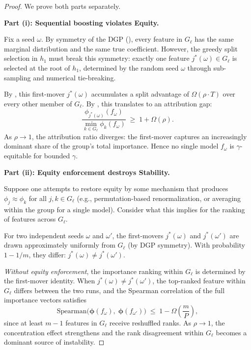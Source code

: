 \documentclass[11pt]{article}
\theoremstyle{remark}
\newcommand{\Gl}{G_\ell}                    %
\newcommand{\phij}{\phi_j}                  %
\newcommand{\phik}{\phi_k}                  %
\newcommand{\totalT}{T}                     %
\newcommand{\rhovar}{\rho}                  %
\begin{document}
\begin{proof}
We prove both parts separately.

\medskip
\noindent\textbf{Part (i): Sequential boosting violates Equity.}

Fix a seed $\omega$.  By symmetry of the DGP
(), every feature in $\Gl$ has the same marginal
distribution and the same true coefficient.  However, the greedy split
selection in $h_1$ must break this symmetry: exactly one feature
$j^*(\omega) \in \Gl$ is selected at the root of $h_1$, determined by
the random seed $\omega$ through sub-sampling and numerical tie-breaking.

By , this first-mover $j^*(\omega)$
accumulates a split advantage of $\Omega(\rhovar \cdot \totalT)$ over
every other member of $\Gl$.  By , this
translates to an attribution gap:
\begin{equation}
  \frac{\phi_{j^*(\omega)}(f_\omega)}
       {\min_{k \in \Gl} \phik(f_\omega)}
  \;\geq\; 1 + \Omega(\rhovar).
\end{equation}
As $\rhovar \to 1$, the attribution ratio diverges: the first-mover
captures an increasingly dominant share of the group's total importance.
Hence no single model $f_\omega$ is $\gamma$-equitable for bounded
$\gamma$.

\medskip
\noindent\textbf{Part (ii): Equity enforcement destroys Stability.}

Suppose one attempts to restore equity by some mechanism that produces
$\phij \approx \phik$ for all $j, k \in \Gl$ (e.g., permutation-based
renormalization, or averaging within the group for a single model).
Consider what this implies for the ranking of features across $\Gl$.

For two independent seeds $\omega$ and $\omega'$, the first-movers
$j^*(\omega)$ and $j^*(\omega')$ are drawn approximately uniformly from
$\Gl$ (by DGP symmetry).  With probability $1 - 1/m$, they differ:
$j^*(\omega) \neq j^*(\omega')$.

\emph{Without equity enforcement}, the importance ranking within $\Gl$ is
determined by the first-mover identity.  When
$j^*(\omega) \neq j^*(\omega')$, the top-ranked feature within $\Gl$
differs between the two runs, and the Spearman correlation of the
full importance vectors satisfies
\begin{equation}
  \mathrm{Spearman}\bigl(\boldsymbol{\phi}(f_\omega),\;
    \boldsymbol{\phi}(f_{\omega'})\bigr)
  \;\leq\; 1 - \Omega\!\left(\frac{m}{P}\right),
\end{equation}
since at least $m - 1$ features in $\Gl$ receive reshuffled ranks.
As $\rhovar \to 1$, the concentration effect strengthens and the
rank disagreement within $\Gl$ becomes a dominant source of instability.


\end{proof}
\end{document}
